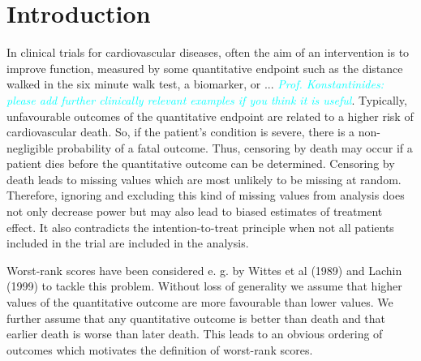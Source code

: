 \documentclass[bimj,fleqn]{w-art}\usepackage[]{graphicx}\usepackage[]{color}
\theoremstyle{plain}
\theoremstyle{definition}
\begin{document}
\maketitle                   %







\section{Introduction}
\label{sec:Intro}

In clinical trials for cardiovascular diseases, often the aim of an
intervention is to improve function, measured by some quantitative endpoint
such as the distance walked in the six minute walk test, a biomarker, or ...
\textcolor{cyan}{\textit{Prof. Konstantinides: please add further clinically
relevant examples if you think it is useful}}.
Typically, unfavourable outcomes of the quantitative endpoint are related to a
higher risk of cardiovascular death. So, if the patient's condition is severe,
there is a non-negligible probability of a fatal outcome. Thus, censoring by
death may occur if a patient dies before the quantitative outcome can be
determined. Censoring by death leads to missing values which are most unlikely
to be missing at random. Therefore, ignoring and excluding this kind of
missing values from analysis does not only decrease power but may also lead to
biased estimates of treatment effect. It also contradicts the
intention-to-treat principle when not all patients included in the trial are
included in the analysis.

Worst-rank scores have been considered e. g. by Wittes et al (1989) and Lachin
(1999) to tackle this problem. Without loss of generality we assume that
higher values of the quantitative outcome are more favourable than lower
values. We further assume that any quantitative outcome is better than death
and that earlier death is worse than later death. This leads to an obvious
ordering of outcomes which motivates the definition of worst-rank scores.
\end{document}
